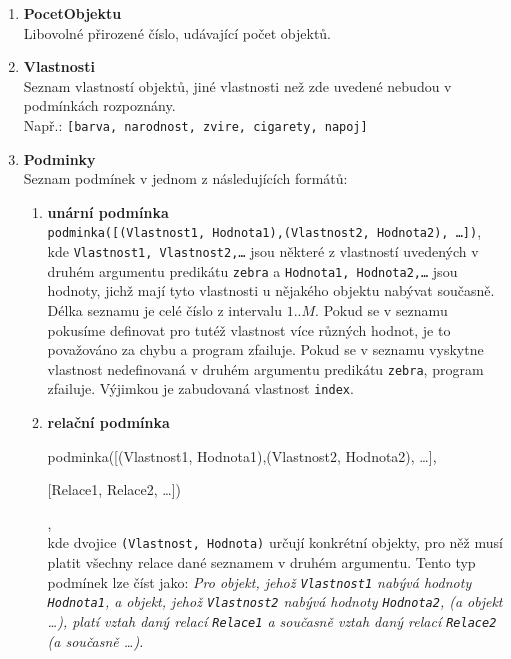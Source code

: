 \documentclass[11pt]{article} %
\begin{document}
\begin{enumerate}
\item \textbf{PocetObjektu} \\
Libovolné přirozené číslo, udávající počet objektů.
\item \textbf{Vlastnosti} \\
Seznam vlastností objektů, jiné vlastnosti než zde uvedené nebudou v podmínkách rozpoznány. \\
Např.: \texttt{[barva, narodnost,  zvire, cigarety, napoj]}
\item \textbf{Podminky} \\
Seznam podmínek v jednom z následujících formátů:
\begin{enumerate}
\item \textbf{unární podmínka} \\

\hskip 20pt \texttt{podminka([(Vlastnost1, Hodnota1),(Vlastnost2, Hodnota2), \ldots ])}, \\

kde \texttt{Vlastnost1, Vlastnost2,\ldots} jsou některé z vlastností uvedených v druhém argumentu predikátu \texttt{zebra} a \texttt{Hodnota1, Hodnota2,\ldots} jsou hodnoty, jichž mají tyto vlastnosti u nějakého objektu nabývat současně. Délka seznamu je celé číslo z intervalu $1 .. M$. Pokud se v seznamu pokusíme definovat pro tutéž vlastnost více různých hodnot, je to považováno za chybu a program zfailuje.  Pokud se v seznamu vyskytne vlastnost nedefinovaná v druhém argumentu predikátu \texttt{zebra}, program zfailuje. Výjimkou je zabudovaná vlastnost \texttt{index}.
\item \textbf{relační podmínka} \\

\hskip 20pt {\ttfamily podminka([(Vlastnost1, Hodnota1),(Vlastnost2, Hodnota2), \ldots ], 

\hskip 20pt {[Relace1, Relace2, \ldots])}}, \\

kde dvojice \texttt{(Vlastnost, Hodnota)} určují konkrétní objekty, pro něž musí platit všechny relace dané seznamem v druhém argumentu. Tento typ podmínek lze číst jako: \emph{Pro objekt, jehož \texttt{Vlastnost1} nabývá hodnoty \texttt{Hodnota1}, a objekt, jehož \texttt{Vlastnost2} nabývá hodnoty \texttt{Hodnota2}, (a objekt \ldots), platí vztah daný relací \texttt{Relace1} a současně vztah daný relací \texttt{Relace2} (a současně \ldots ).} 


\end{enumerate}
\end{enumerate}
\end{document}
